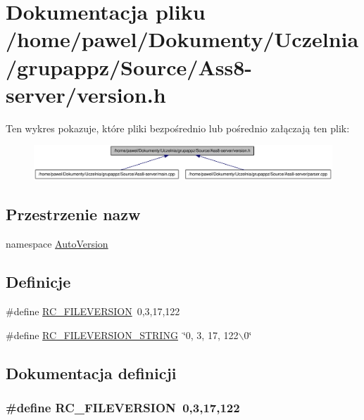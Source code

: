 \hypertarget{a00010}{
\section{Dokumentacja pliku /home/pawel/Dokumenty/Uczelnia/grupappz/Source/Ass8-server/version.h}
\label{a00010}
}


Ten wykres pokazuje, które pliki bezpośrednio lub pośrednio załączają ten plik:\nopagebreak
\begin{figure}[H]
\begin{center}
\leavevmode
\includegraphics[width=372pt]{a00032}
\end{center}
\end{figure}
\subsection*{Przestrzenie nazw}
\begin{CompactItemize}
\item 
namespace \hyperlink{a00012}{AutoVersion}
\end{CompactItemize}
\subsection*{Definicje}
\begin{CompactItemize}
\item 
\#define \hyperlink{a00010_0e86d046ea87587e402d375c6b0927c6}{RC\_\-FILEVERSION}~0,3,17,122
\item 
\#define \hyperlink{a00010_4763e81d3c29ec0fab79225d3ec3f1a2}{RC\_\-FILEVERSION\_\-STRING}~\char`\"{}0, 3, 17, 122$\backslash$0\char`\"{}
\end{CompactItemize}


\subsection{Dokumentacja definicji}
\hypertarget{a00010_0e86d046ea87587e402d375c6b0927c6}{
\subsubsection[{RC\_\-FILEVERSION}]{\setlength{\rightskip}{0pt plus 5cm}\#define RC\_\-FILEVERSION~0,3,17,122}}
\label{a00010_0e86d046ea87587e402d375c6b0927c6}




